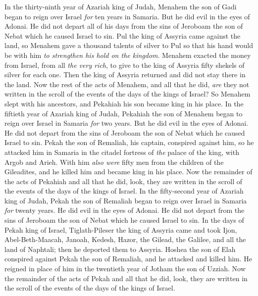\begin{biblechapter}
 In the thirty-ninth year of Azariah king of Judah, Menahem the son of Gadi began to reign over Israel \textit{for} ten years in Samaria.
\verse But he did evil in the eyes of Adonai. He did not depart all of his days from the sins of Jeroboam the son of Nebat which he caused Israel to sin.
\verse Pul the king of Assyria came against the land, so Menahem gave a thousand talents of silver to Pul so that his hand would be with him \textit{to strengthen his hold on the kingdom}.
\verse Menahem exacted the money from Israel, from all \textit{the very rich}, to give to the king of Assyria fifty shekels of silver for each one. Then the king of Assyria returned and did not stay there in the land.
\verse Now the rest of the acts of Menahem, and all that he did, \textit{are} they not written in the scroll of the events of the days of the kings of Israel?
\verse So Menahem slept with his ancestors, and Pekahiah his son became king in his place.
 In the fiftieth year of Azariah king of Judah, Pekahiah the son of Menahem began to reign over Israel in Samaria \textit{for} two years.
\verse But he did evil in the eyes of Adonai. He did not depart from the sins of Jeroboam the son of Nebat which he caused Israel to sin.
\verse Pekah the son of Remaliah, his captain, conspired against him, so he attacked him in Samaria in the citadel fortress of \textit{the} palace of the king, with Argob and Arieh. With him \textit{also were} fifty men from the children of the Gileadites, and he killed him and became king in his place.
\verse Now the remainder of the acts of Pekahiah and all that he did, look, they are written in the scroll of the events of the days of the kings of Israel.
 In the fifty-second year of Azariah king of Judah, Pekah the son of Remaliah began to reign over Israel in Samaria \textit{for} twenty years.
\verse He did evil in the eyes of Adonai. He did not depart from the sins of Jeroboam the son of Nebat which he caused Israel to sin.
\verse In the days of Pekah king of Israel, Tiglath-Pileser the king of Assyria came and took Ijon, Abel-Beth-Maacah, Janoah, Kedesh, Hazor, the Gilead, the Galilee, and all the land of Naphtali; then he deported them to Assyria.
\verse Hoshea the son of Elah conspired against Pekah the son of Remaliah, and he attacked and killed him. He reigned in place of him in the twentieth year of Jotham the son of Uzziah.
\verse Now the remainder of the acts of Pekah and all that he did, look, they are written in the scroll of the events of the days of the kings of Israel.

\end{biblechapter}
